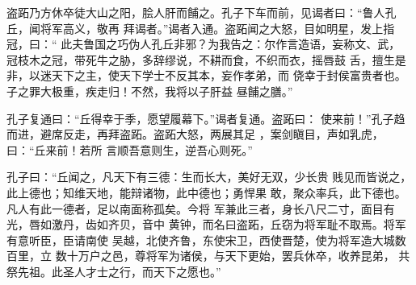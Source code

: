 \documentclass[a4paper,12pt,UTF8,twoside]{ctexbook}
\begin{document}
盗跖乃方休卒徒大山之阳，脍人肝而餔之。孔子下车而前，见谒者曰：“鲁人孔丘，闻将军高义，敬再 拜谒者。”谒者入通。盗跖闻之大怒，目如明星，发上指冠，曰：“ 此夫鲁国之巧伪人孔丘非邪？为我告之：尔作言造语，妄称文、武， 冠枝木之冠，带死牛之胁，多辞缪说，不耕而食，不织而衣，摇唇鼓 舌，擅生是非，以迷天下之主，使天下学士不反其本，妄作孝弟，而 侥幸于封侯富贵者也。子之罪大极重，疾走归！不然，我将以子肝益 昼餔之膳。”

孔子复通曰：“丘得幸于季，愿望履幕下。”谒者复通。盗跖曰： 使来前！”孔子趋而进，避席反走，再拜盗跖。盗跖大怒，两展其足 ，案剑瞋目，声如乳虎，曰：“丘来前！若所 言顺吾意则生，逆吾心则死。”

孔子曰：“丘闻之，凡天下有三德：生而长大，美好无双，少长贵 贱见而皆说之，此上德也；知维天地，能辩诸物，此中德也；勇悍果 敢，聚众率兵，此下德也。凡人有此一德者，足以南面称孤矣。今将 军兼此三者，身长八尺二寸，面目有光，唇如激丹，齿如齐贝，音中 黄钟，而名曰盗跖，丘窃为将军耻不取焉。将军有意听臣，臣请南使 吴越，北使齐鲁，东使宋卫，西使晋楚，使为将军造大城数百里，立 数十万户之邑，尊将军为诸侯，与天下更始，罢兵休卒，收养昆弟， 共祭先祖。此圣人才士之行，而天下之愿也。”
\end{document}
